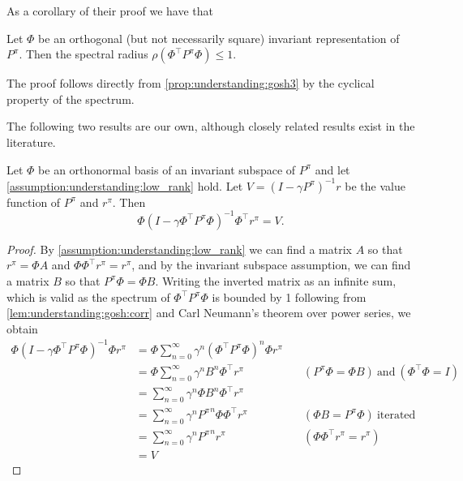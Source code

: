 As a corollary of their proof we have that 

\begin{lemma}\label{lem:understanding:gosh:corr}
    Let $\Phi$ be an orthogonal (but not necessarily square) invariant representation of $P^\pi$. Then the spectral radius $\rho(\Phi^\top P^\pi \Phi) \leq 1.$ 
\end{lemma}

The proof follows directly from \autoref{prop:understanding:gosh3} by the cyclical property of the spectrum.
    

The following two results are our own, although closely related results exist in the literature.

\begin{lemma}\label{lem:understanding:lossless_approx}
    Let $\Phi$ be an orthonormal basis of an invariant subspace of $P^\pi$ and let \autoref{assumption:understanding:low_rank} hold. Let $V = (I - \gamma P^\pi)^{-1} r$ be the value function of $P^\pi$ and $r^\pi$. Then $$\Phi (I - \gamma \Phi^\top P^\pi \Phi)^{-1} \Phi^\top r^\pi = V.$$
\end{lemma}
\begin{proof}
    By \autoref{assumption:understanding:low_rank} we can find a matrix $A$ so that $r^\pi = \Phi A$ and $\Phi\Phi^\top r^\pi = r^\pi$, and by the invariant subspace assumption, we can find a matrix $B$ so that $P^\pi \Phi = \Phi B$.
    Writing the inverted matrix as an infinite sum, which is valid as the spectrum of $\Phi^\top P^\pi \Phi$ is bounded by 1 following from \autoref{lem:understanding:gosh:corr} and Carl Neumann's theorem over power series, we obtain
    \begin{align}
        \Phi (I - \gamma \Phi^\top P^\pi \Phi)^{-1} \Phi r^\pi &= \Phi \sum_{n=0}^\infty \gamma^n (\Phi^\top P^\pi \Phi)^n \Phi r^\pi \\
        &= \Phi \sum_{n=0}^\infty \gamma^n B^n \Phi^\top r^\pi &\quad (P^\pi \Phi = \Phi B)~\text{and}~(\Phi^\top \Phi = I)\\
        &= \sum_{n=0}^\infty \gamma^n \Phi B^n \Phi^\top r^\pi \\
        &= \sum_{n=0}^\infty \gamma^n {P^\pi}^n \Phi\Phi^\top r^\pi &\quad (\Phi B = P^\pi \Phi)~\text{iterated} \\
        &= \sum_{n=0}^\infty \gamma^n {P^\pi}^n r^\pi &\quad (\Phi\Phi^\top r^\pi = r^\pi) \\
        &= V
    \end{align}
\end{proof}



